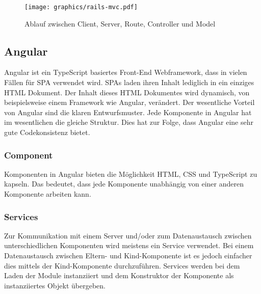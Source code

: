 \begin{figure}[h]
	\texttt{[image: graphics/rails-mvc.pdf]}
	\caption{Ablauf zwischen Client, Server, Route, Controller und Model}
	\label{fig:rails-mvc}
\end{figure}


\subsection{Angular}
\label{sec: angular}
Angular ist ein TypeScript basiertes Front-End Webframework, dass in vielen Fällen für \gls{SPA} verwendet wird. \gls{SPA}s laden ihren Inhalt lediglich in ein einziges \gls{HTML} Dokument. Der Inhalt dieses \gls{HTML} Dokumentes wird dynamisch, von beispielsweise einem Framework wie Angular, verändert. Der wesentliche Vorteil von Angular sind die klaren Entwurfsmuster. Jede Komponente in Angular hat im wesentlichen die gleiche Struktur. Dies hat zur Folge, dass Angular eine sehr gute Codekonsistenz bietet.

\subsubsection{Component}
\label{sec: ang-component}
Komponenten in Angular bieten die Möglichkeit \gls{HTML}, \gls{CSS} und TypeScript zu kapseln. Das bedeutet, dass jede Komponente unabhängig von einer anderen Komponente arbeiten kann.


\subsubsection{Services}
\label{sec: ang-service}
Zur Kommunikation mit einem Server und/oder zum Datenaustausch zwischen unterschiedlichen Komponenten wird meistens ein Service verwendet. Bei einem Datenaustausch zwischen Eltern- und Kind-Komponente ist es jedoch einfacher dies mittels der Kind-Komponente durchzuführen. Services werden bei dem Laden der Module instanziiert und dem Konstruktor der Komponente als instanziiertes Objekt übergeben.

